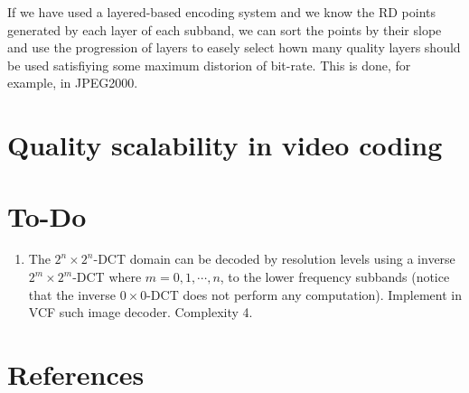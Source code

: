 If we have used a layered-based encoding system and we know the RD
points generated by each layer of each subband, we can sort the points
by their slope and use the progression of layers to easely select hown
many quality layers should be used satisfiying some maximum distorion
of bit-rate. This is done, for example, in JPEG2000.

\section{Quality scalability in video coding}

\section{To-Do}
\begin{enumerate}
\item The $2^n\times 2^n$-DCT domain can be decoded by resolution
  levels using a inverse $2^m\times 2^m$-DCT where $m=0,1,\cdots,n$,
  to the lower frequency subbands (notice that the inverse
  $0\times 0$-DCT does not perform any computation). Implement in VCF
  such image decoder. Complexity 4.
  
\end{enumerate}

\section{References}

\renewcommand{\addcontentsline}[3]{}%

